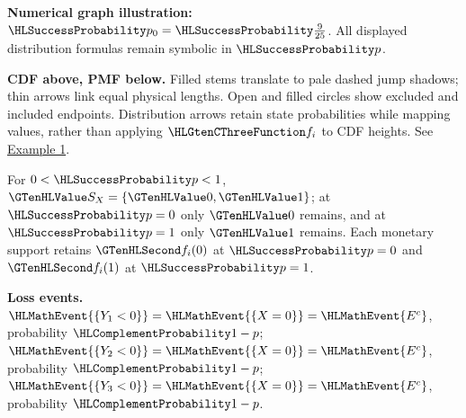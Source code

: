 {\begin{center}
\end{center}
\textbf{Numerical graph illustration:} $\SuccessProb{p_0}=\SuccessProb{\frac{9}{25}}$. All displayed distribution formulas remain symbolic in $\SuccessProb{p}$.
\par\textbf{CDF above, PMF below.} Filled stems translate to pale dashed jump shadows; thin arrows link equal physical lengths. Open and filled circles show excluded and included endpoints. Distribution arrows retain state probabilities while mapping values, rather than applying $\TransformationFunction{f_i}$ to CDF heights. See \hyperref[ex:intro-one]{Example 1}.\par
For $0<\SuccessProb{p}<1$, $\Indicator{S_X}=\{\Indicator{0},\Indicator{1}\}$; at $\SuccessProb{p}=0$ only $\Indicator{0}$ remains, and at $\SuccessProb{p}=1$ only $\Indicator{1}$ remains. Each monetary support retains $\Money{f_i(0)}$ at $\SuccessProb{p}=0$ and $\Money{f_i(1)}$ at $\SuccessProb{p}=1$.
\par\textbf{Loss events.} $\HLMathEvent{\{Y_1<0\}}=\HLMathEvent{\{X=0\}}=\HLMathEvent{E^c}$, probability $\FailureProb{1-p}$; $\HLMathEvent{\{Y_2<0\}}=\HLMathEvent{\{X=0\}}=\HLMathEvent{E^c}$, probability $\FailureProb{1-p}$; $\HLMathEvent{\{Y_3<0\}}=\HLMathEvent{\{X=0\}}=\HLMathEvent{E^c}$, probability $\FailureProb{1-p}$.
\endgroup
}
